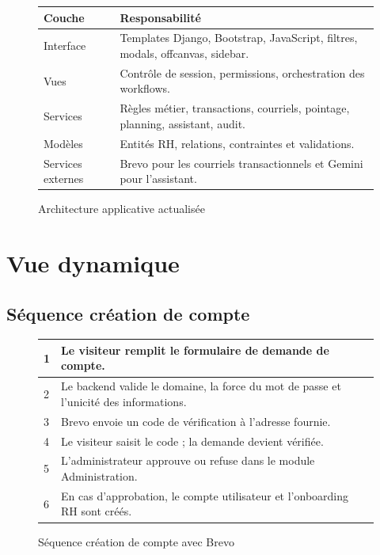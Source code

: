 \documentclass[12pt,a4paper]{report}
\begin{document}
\begin{figure}[H]
\centering
\renewcommand{\arraystretch}{1.2}
\begin{tabular}{|p{4cm}|p{10cm}|}
\hline
\textbf{Couche} & \textbf{Responsabilité}\\ \hline
Interface & Templates Django, Bootstrap, JavaScript, filtres, modals, offcanvas, sidebar.\\ \hline
Vues & Contrôle de session, permissions, orchestration des workflows.\\ \hline
Services & Règles métier, transactions, courriels, pointage, planning, assistant, audit.\\ \hline
Modèles & Entités RH, relations, contraintes et validations.\\ \hline
Services externes & Brevo pour les courriels transactionnels et Gemini pour l'assistant.\\ \hline
\end{tabular}
\caption{Architecture applicative actualisée}
\label{fig:architecture}
\end{figure}

\section{Vue dynamique}
\subsection{Séquence création de compte}
\begin{figure}[H]
\centering
\renewcommand{\arraystretch}{1.2}
\begin{tabular}{|p{2cm}|p{11cm}|}
\hline
1 & Le visiteur remplit le formulaire de demande de compte.\\ \hline
2 & Le backend valide le domaine, la force du mot de passe et l'unicité des informations.\\ \hline
3 & Brevo envoie un code de vérification à l'adresse fournie.\\ \hline
4 & Le visiteur saisit le code ; la demande devient vérifiée.\\ \hline
5 & L'administrateur approuve ou refuse dans le module Administration.\\ \hline
6 & En cas d'approbation, le compte utilisateur et l'onboarding RH sont créés.\\ \hline
\end{tabular}
\caption{Séquence création de compte avec Brevo}
\label{fig:sequence-compte}
\end{figure}
\end{document}
